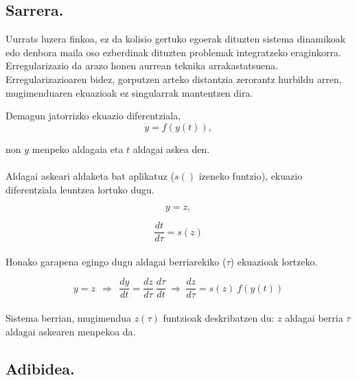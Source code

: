 \subsection*{Sarrera.}

Uurrats luzera finkoa, ez da kolisio gertuko egoerak dituzten sistema dinamikoak edo denbora maila oso ezberdinak dituzten problemak integratzeko eraginkorra. Erregularizazio da arazo honen aurrean teknika arrakastatsuena. Erregularizazioaren bidez,  gorputzen arteko distantzia zerorantz hurbildu arren, mugimenduaren ekuazioak ez singularrak mantentzen dira.   

Demagun jatorrizko ekuazio diferentziala,
\begin{equation*}
\dot{y}=f(y(t)),
\end{equation*}

non $y$ menpeko aldagaia eta $t$ aldagai askea den.

\paragraph*{} Aldagai askeari aldaketa bat aplikatuz ($s()$ izeneko funtzio), ekuazio diferentziala leuntzea lortuko dugu. 

\begin{equation*}
y=z,
\end{equation*}

\begin{equation*}
\frac{dt}{d\tau}=s(z)
\end{equation*}

\paragraph*{} Honako garapena egingo dugu aldagai berriarekiko ($\tau$) ekuazioak lortzeko.

\begin{equation*}
y=z \ \ \Rightarrow \ \ \frac{dy}{dt}=\frac{dz}{d \tau} \ \frac{d \tau}{dt} \ \Rightarrow \ \frac{dz}{d \tau}= s(z) \ f(y(t)) 
\end{equation*}

\paragraph*{} Sistema berrian, mugimendua $z(\tau)$ funtzioak deskribatzen du: $z$ aldagai berria $\tau$ aldagai askearen menpekoa da. 

\subsection{Adibidea.}

